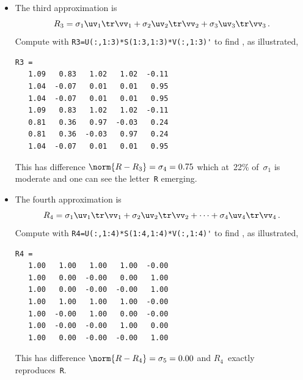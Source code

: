 \begin{example}
\begin{solution}
\begin{itemize}
\item The third approximation is 
\begin{equation*}
R_3=\sigma_1\uv_1\tr\vv_1 +\sigma_2\uv_2\tr\vv_2 +\sigma_3\uv_3\tr\vv_3\,.
\end{equation*}
Compute with \verb|R3=U(:,1:3)*S(1:3,1:3)*V(:,1:3)'| to find \twodp, as illustrated, 
\marginpar{}
\begin{verbatim}
R3 =
   1.09   0.83   1.02   1.02  -0.11
   1.04  -0.07   0.01   0.01   0.95
   1.04  -0.07   0.01   0.01   0.95
   1.09   0.83   1.02   1.02  -0.11
   0.81   0.36   0.97  -0.03   0.24
   0.81   0.36  -0.03   0.97   0.24
   1.04  -0.07   0.01   0.01   0.95
\end{verbatim}
This has difference \(\norm{R-R_3}=\sigma_4=0.75\) which at~22\% of~\(\sigma_1\) is moderate and one can see the letter~\verb|R| emerging.
 
\item The fourth approximation is 
\begin{equation*}
R_4=\sigma_1\uv_1\tr\vv_1+\sigma_2\uv_2\tr\vv_2+\cdots+\sigma_4\uv_4\tr\vv_4\,.
\end{equation*}
Compute with \verb|R4=U(:,1:4)*S(1:4,1:4)*V(:,1:4)'| to find \twodp, as illustrated, 
\marginpar{}
\begin{verbatim}
R4 =
   1.00   1.00   1.00   1.00  -0.00
   1.00   0.00  -0.00   0.00   1.00
   1.00   0.00  -0.00  -0.00   1.00
   1.00   1.00   1.00   1.00  -0.00
   1.00  -0.00   1.00   0.00  -0.00
   1.00  -0.00  -0.00   1.00   0.00
   1.00   0.00  -0.00  -0.00   1.00
\end{verbatim}
This has difference \(\norm{R-R_4}=\sigma_5=0.00\) and \(R_4\)~exactly reproduces~\verb|R|.
 
\end{itemize}
\end{solution}
\end{example}





